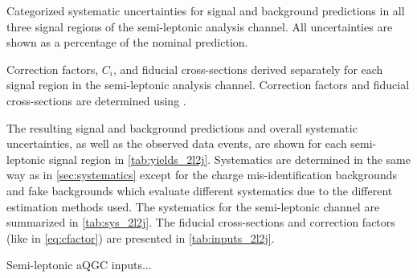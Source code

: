 \begin{table}[ht!]
\centering

\caption{Categorized systematic uncertainties 
for signal and background predictions in all three signal regions
of the semi-leptonic analysis channel.
All uncertainties are shown as a percentage of the nominal
prediction.  }
\label{tab:sys_2l2j}
\end{table}

\begin{table}[ht!]
\centering

\caption{Correction factors, $C_i$, and fiducial cross-sections derived
separately for each signal region in the semi-leptonic analysis channel. 
Correction factors and  fiducial cross-sections are determined
using \madgraph.}
\label{tab:inputs_2l2j}
\end{table}

The resulting signal and background predictions and overall systematic uncertainties,
as well as the observed data events,
are shown for each semi-leptonic signal region in \tab\ref{tab:yields_2l2j}. Systematics
are determined in the same way as in \sec\ref{sec:systematics} except for the charge
mis-identification backgrounds and fake backgrounds which evaluate different systematics due
to the different estimation methods used. The systematics for the semi-leptonic
channel are summarized in \tab\ref{tab:sys_2l2j}. The fiducial cross-sections
and correction factors (like in \eqn\eqref{eq:cfactor}) are presented in \tab\ref{tab:inputs_2l2j}.

Semi-leptonic aQGC inputs...

